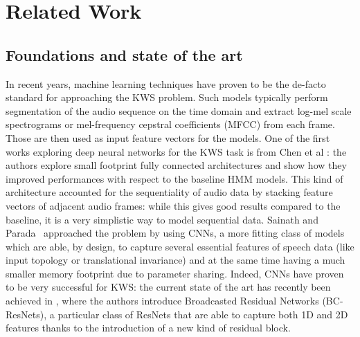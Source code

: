 
\section{Related Work}
\label{sec:related_work}

\subsection{Foundations and state of the art}

In recent years, machine learning techniques have proven to be the de-facto standard for approaching the KWS problem. Such models typically perform segmentation of the audio sequence on the time domain and extract log-mel scale spectrograms or mel-frequency cepstral coefficients (MFCC) \cite{mfccs1980davis} from each frame. Those are then used as input feature vectors for the models.
One of the first works exploring deep neural networks for the KWS task is from Chen et al \cite{dnns2014chen}: the authors explore small footprint fully connected architectures and show how they improved performances with respect to the baseline HMM models. This kind of architecture accounted for the sequentiality of audio data by stacking feature vectors of adjacent audio frames: while this gives good results compared to the baseline, it is a very simplistic way to model sequential data. Sainath and Parada~\cite{convnns2015sainath} approached the problem by using CNNs, a more fitting class of models which are able, by design, to capture several essential features of speech data (like input topology or translational invariance) and at the same time having a much smaller memory footprint due to parameter sharing. Indeed, CNNs have proven to be very successful for KWS: the current state of the art has recently been achieved in \cite{kim2021broadcasted}, where the authors introduce Broadcasted Residual Networks (BC-ResNets), a particular class of ResNets that are able to capture both 1D and 2D features thanks to the introduction of a new kind of residual block.

